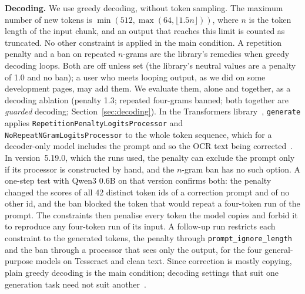\documentclass[conference]{IEEEtran}
\begin{document}
\textbf{Decoding.} We use greedy decoding, without token sampling. The maximum number of new tokens is $\min(512,\max(64,\lfloor1.5n\rfloor))$, where $n$ is the token length of the input chunk, and an output that reaches this limit is counted as truncated. No other constraint is applied in the main condition. A repetition penalty and a ban on repeated $n$-grams are the library's remedies when greedy decoding loops. Both are off unless set (the library's neutral values are a penalty of 1.0 and no ban); a user who meets looping output, as we did on some development pages, may add them. We evaluate them, alone and together, as a decoding ablation (penalty 1.3; repeated four-grams banned; both together are \emph{guarded} decoding; Section~\ref{sec:decoding}). In the Transformers library~\cite{wolf2020transformers}, \texttt{generate} applies \texttt{RepetitionPenaltyLogitsProcessor} and \texttt{NoRepeatNGramLogitsProcessor} to the whole token sequence, which for a decoder-only model includes the prompt and so the OCR text being corrected~\cite{hf2026logits}. In version~5.19.0, which the runs used, the penalty can exclude the prompt only if its processor is constructed by hand, and the $n$-gram ban has no such option. A one-step test with Qwen3 0.6B on that version confirms both: the penalty changed the scores of all 42 distinct token ids of a correction prompt and of no other id, and the ban blocked the token that would repeat a four-token run of the prompt. The constraints then penalise every token the model copies and forbid it to reproduce any four-token run of its input. A follow-up run restricts each constraint to the generated tokens, the penalty through \texttt{prompt\_ignore\_length} and the ban through a processor that sees only the output, for the four general-purpose models on Tesseract and clean text. Since correction is mostly copying, plain greedy decoding is the main condition; decoding settings that suit one generation task need not suit another~\cite{wiher2022decoding}.
\end{document}
